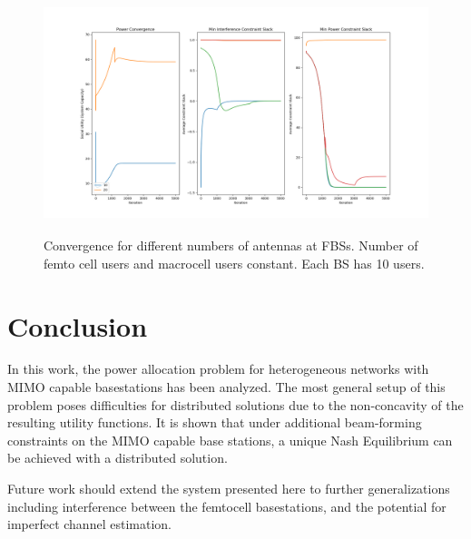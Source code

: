 \documentclass[12pt,a4paper]{report}
\begin{document}
\begin{figure}[H]
	  	\includegraphics[width=\textwidth,height = 7cm]{figures/increasing_antenna}
	  		  \caption{Convergence for different numbers of antennas at FBSs. Number of femto cell users and macrocell users constant. Each BS has 10 users.}
	  \label{fig:}
\end{figure}



\chapter{Conclusion}
In this work, the power allocation problem for heterogeneous networks with MIMO capable basestations has been analyzed. The most general setup of this problem poses difficulties for distributed solutions due to the non-concavity of the resulting utility functions. It is shown that under additional beam-forming constraints on the MIMO capable base stations, a unique Nash Equilibrium can be achieved with a distributed solution. 
\par
Future work should extend the system presented here to further generalizations including interference between the femtocell basestations, and the potential for imperfect channel estimation. 
\newpage

\end{document}
